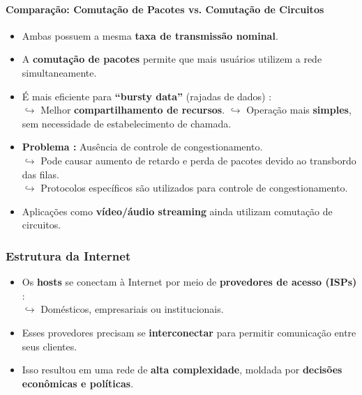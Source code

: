     \paragraph{Comparação: Comutação de Pacotes vs. Comutação de Circuitos}
    \begin{itemize}
        \item Ambas possuem a mesma \textbf{taxa de transmissão nominal}.
        \item A \textbf{comutação de pacotes} permite que mais usuários utilizem a rede simultaneamente.
        \item É mais eficiente para \textbf{“bursty data”} (rajadas de dados) : \\    
            $\hookrightarrow$ Melhor \textbf{compartilhamento de recursos}.
            $\hookrightarrow$ Operação mais \textbf{simples}, sem necessidade de estabelecimento de chamada.
        
        \item \textbf{Problema :} Ausência de controle de congestionamento. \\
            $\hookrightarrow$ Pode causar aumento de retardo e perda de pacotes devido ao transbordo das filas. \\
            $\hookrightarrow$ Protocolos específicos são utilizados para controle de congestionamento.
        
        \item Aplicações como \textbf{vídeo/áudio streaming} ainda utilizam comutação de circuitos.
    
    \end{itemize}

    \subsubsection*{Estrutura da Internet}
    \begin{itemize}
        \item Os \textbf{hosts} se conectam à Internet por meio de \textbf{provedores de acesso (ISPs)} : \\
            $\hookrightarrow$ Domésticos, empresariais ou institucionais.
        \item Esses provedores precisam se \textbf{interconectar} para permitir comunicação entre seus clientes.
        \item Isso resultou em uma rede de \textbf{alta complexidade}, moldada por \textbf{decisões econômicas e políticas}.
    \end{itemize}

